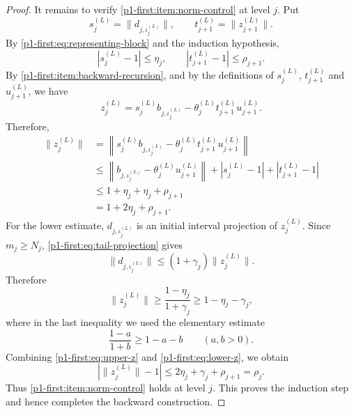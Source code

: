 \documentclass[11pt,reqno]{amsart}
\makeatletter
\theoremstyle{plain}
\theoremstyle{definition}
\newcounter{problempaper}
\newenvironment{problempaperbody}{%
  \setcounter{subsection}{0}%
  \setcounter{subsubsection}{0}%
  \setcounter{paragraph}{0}%
  \renewcommand{\thesubsection}{\arabic{subsection}}%
  \renewcommand{\thesubsubsection}{\thesubsection.\arabic{subsubsection}}%
  \renewcommand{\theparagraph}{\thesubsubsection.\arabic{paragraph}}%
  \let\problem@outersection\section
  \let\problem@outersubsection\subsection
  \let\problem@outersubsubsection\subsubsection
  \let\problem@outerparagraph\paragraph
  \let\section\problem@papersection
  \let\subsection\problem@papersubsection
  \let\subsubsection\problem@papersubsubsection
}{%
  \let\section\problem@outersection
  \let\subsection\problem@outersubsection
  \let\subsubsection\problem@outersubsubsection
  \let\paragraph\problem@outerparagraph
}
\newcommand{\problem@target}[2]{%
  \hypertarget{problem-\theproblempaper-#1-#2}{}%
}
\newcommand{\problem@paperheading}[3]{%
  \par\bigskip
  \problem@target{#1}{#2}%
  \noindent{\large\bfseries #2.\quad #3\par}%
  \nobreak\smallskip
}
\newcommand{\problem@papersubheading}[3]{%
  \par\medskip
  \problem@target{#1}{#2}%
  \noindent{\normalsize\bfseries #2.\quad #3\par}%
  \nobreak\smallskip
}
\newcommand{\problem@papersubsubheading}[3]{%
  \par\smallskip
  \problem@target{#1}{#2}%
  \noindent{\normalsize\itshape #2.\quad #3.\ }%
}
\def\problem@papersection{%
  \@ifstar{\problem@papersectionstar}{\problem@papersectionnostar}%
}
\def\problem@papersectionstar#1{%
  \par\bigskip\noindent{\large\bfseries #1\par}\nobreak\smallskip
}
\def\problem@papersectionnostar#1{%
  \refstepcounter{subsection}%
  \setcounter{subsubsection}{0}%
  \setcounter{paragraph}{0}%
  \problem@paperheading{section}{\thesubsection}{#1}%
  \problem@writecontentsline{section}{\thesubsection}{#1}%
}
\def\problem@papersubsection{%
  \@ifstar{\problem@papersubsectionstar}{\problem@papersubsectionnostar}%
}
\def\problem@papersubsectionstar#1{%
  \par\medskip\noindent{\normalsize\bfseries #1\par}\nobreak\smallskip
}
\def\problem@papersubsectionnostar#1{%
  \refstepcounter{subsubsection}%
  \setcounter{paragraph}{0}%
  \problem@papersubheading{subsection}{\thesubsubsection}{#1}%
  \problem@writecontentsline{subsection}{\thesubsubsection}{#1}%
}
\def\problem@papersubsubsection{%
  \@ifstar{\problem@papersubsubsectionstar}{\problem@papersubsubsectionnostar}%
}
\def\problem@papersubsubsectionstar#1{%
  \par\smallskip\noindent{\normalsize\itshape #1.\ }%
}
\def\problem@papersubsubsectionnostar#1{%
  \refstepcounter{paragraph}%
  \problem@papersubsubheading{subsubsection}{\theparagraph}{#1}%
  \problem@writecontentsline{subsubsection}{\theparagraph}{#1}%
}
\newcommand{\problem@writecontentsline}[3]{%
  \begingroup
  \protected@write\@auxout{}{%
    \string\problemcontentsentry{\theproblempaper}{#1}{#2}{#3}{\thepage}%
  }%
  \endgroup
}
\newcommand{\problemcontentsentry}[5]{%
  \@ifundefined{problemcontents@#1}{%
    \expandafter\gdef\csname problemcontents@#1\endcsname{}%
  }{}%
  \expandafter\g@addto@macro\csname problemcontents@#1\endcsname{%
    \problemcontentsline{#1}{#2}{#3}{#4}{#5}%
  }%
}
\newcommand{\problemcontentslink}[4]{%
  \hyperlink{problem-#1-#2-#3}{#4}%
}
\newcommand{\problemcontentsline}[5]{%
  \ifstrequal{#2}{section}{%
    \par\noindent
    \problemcontentslink{#1}{#2}{#3}{\makebox[2.5em][l]{#3}#4}%
    \nobreak\dotfill
    \problemcontentslink{#1}{#2}{#3}{#5}\par
  }{%
    \ifstrequal{#2}{subsection}{%
      \par\noindent\hspace*{1.5em}%
      \problemcontentslink{#1}{#2}{#3}{\makebox[3.5em][l]{#3}#4}%
      \nobreak\dotfill
      \problemcontentslink{#1}{#2}{#3}{#5}\par
    }{%
      \par\noindent\hspace*{3em}%
      \problemcontentslink{#1}{#2}{#3}{\makebox[4.5em][l]{#3}#4}%
      \nobreak\dotfill
      \problemcontentslink{#1}{#2}{#3}{#5}\par
    }%
  }%
}
\makeatother
\begin{document}
\begin{problempaperbody}
\begin{proof}
It remains to verify \ref{p1-first:item:norm-control} at level $j$. Put
\begin{equation*}
        s_j^{(L)}=\|d_{j,\iota_j^{(L)}}\|,
        \qquad
        t_{j+1}^{(L)}=\|z_{j+1}^{(L)}\|.
\end{equation*}
By \eqref{p1-first:eq:representing-block} and the induction hypothesis,
\begin{equation*}
        |s_j^{(L)}-1|\leq\eta_j,
        \qquad
        |t_{j+1}^{(L)}-1|\leq\rho_{j+1}.
\end{equation*}
By \ref{p1-first:item:backward-recursion}, and by the definitions of $s_j^{(L)}$, $t_{j+1}^{(L)}$ and $u_{j+1}^{(L)}$, we have
\begin{equation*}
        z_j^{(L)}=s_j^{(L)}b_{j,\iota_j^{(L)}}-\theta_j^{(L)}t_{j+1}^{(L)}u_{j+1}^{(L)}.
\end{equation*}
Therefore,
\begin{equation}
\label{p1-first:eq:upper-z}
\begin{aligned}
        \|z_j^{(L)}\|
        &=\left\|s_j^{(L)}b_{j,\iota_j^{(L)}}-\theta_j^{(L)}t_{j+1}^{(L)}u_{j+1}^{(L)}\right\|\\
        &\leq \left\|b_{j,\iota_j^{(L)}}-\theta_j^{(L)}u_{j+1}^{(L)}\right\|+|s_j^{(L)}-1|+|t_{j+1}^{(L)}-1|\\
        &\leq 1+\eta_j+\eta_j+\rho_{j+1}\\
        &=1+2\eta_j+\rho_{j+1}.
\end{aligned}
\end{equation}
For the lower estimate, $d_{j,\iota_j^{(L)}}$ is an initial interval projection of $z_j^{(L)}$. Since $m_j\geq N_j$, \eqref{p1-first:eq:tail-projection} gives
\begin{equation*}
        \|d_{j,\iota_j^{(L)}}\|\leq (1+\gamma_j)\|z_j^{(L)}\|.
\end{equation*}
Therefore
\begin{equation}
\label{p1-first:eq:lower-z}
        \|z_j^{(L)}\|\geq \frac{1-\eta_j}{1+\gamma_j}\geq 1-\eta_j-\gamma_j,
\end{equation}
where in the last inequality we used the elementary estimate
\begin{equation*}
        \frac{1-a}{1+b}\geq 1-a-b \qquad(a,b>0).
\end{equation*}
Combining \eqref{p1-first:eq:upper-z} and \eqref{p1-first:eq:lower-z}, we obtain
\begin{equation*}
        |\|z_j^{(L)}\|-1|\leq 2\eta_j+\gamma_j+\rho_{j+1}=\rho_j.
\end{equation*}
Thus \ref{p1-first:item:norm-control} holds at level $j$. This proves the induction step and hence completes the backward construction.


\end{proof}
\end{problempaperbody}
\end{document}
